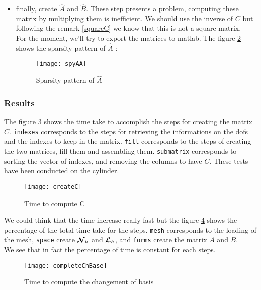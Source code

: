 \begin{itemize}
\begin{figure}[H]
\label{spyC}
\end{figure}
\item finally, create $\widehat{A}$ and $\widehat{B}$. These step presents a
  problem, computing these matrix by multiplying them is inefficient. We should
  use the inverse of $C$ but following the remark \ref{squareC} we know that this is not a square matrix.\\
For the moment, we'll try to export the matrices to matlab.
The figure \ref{spyAA} shows the sparsity pattern of $\widehat{A}$ : 
\begin{figure}[H]
\centering
\texttt{[image: spyAA]}
\caption{Sparsity pattern of $\widehat{A}$}
\label{spyAA}
\end{figure}
\end{itemize}

\subsubsection{Results}

The figure \ref{timeC} shows the time take to accomplish the steps for creating the matrix $C$. \texttt{indexes} corresponds to the steps for retrieving the informations on the dofs and the indexes to keep in the matrix. \texttt{fill} corresponds to the steps of creating the two matrices, fill them and assembling them. \texttt{submatrix} corresponds to sorting the vector of indexes, and removing the columns to have $C$. These tests have been conducted on the cylinder.\\

\begin{figure}[H]
\centering
\texttt{[image: createC]}
\caption{Time to compute C}
\label{timeC}
\end{figure}

We could think that the time increase really fast but the figure \ref{completeTime} shows the percentage of the total time take for the steps. \texttt{mesh} corresponds to the loading of the mesh, \texttt{space} create ${\bm{\mathcal{N}}}_h$ and ${\bm{\mathcal{L}}}_h$, and \texttt{forms} create the matrix $A$ and $B$.\\
We see that in fact the percentage of time is constant for each steps.

\begin{figure}[H]
\centering
\texttt{[image: completeChBase]}
\caption{Time to compute the changement of basis}
\label{completeTime}
\end{figure}

